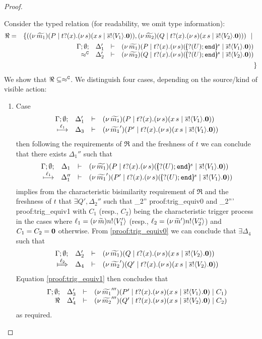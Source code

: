 \begin{proof}
\begin{enumerate}
				\noi Consider the typed relation (for readability, we omit type information):
				\begin{eqnarray*}
					\Re	&=&		\set{	(\newsp{\widetilde{m_1}}{P \Par \hotrigger{t}{x}{s}{V_1}},
										\newsp{\widetilde{m_2}}{Q \Par \hotrigger{t}{x}{s}{V_2}})
								\setbar\\
						&&			\mhorel{\Gamma}{\Delta_1'}{\newsp{\widetilde{m_1}}{P \Par \fotrigger{t}{x}{s}{\btinp{U} \tinact}{V_1}}}
									{\fwb}
									{\Delta_2'}{}{\newsp{\widetilde{m_2}}{Q \Par \fotrigger{t}{x}{s}{\btinp{U} \tinact}{V_2}}}
						\\
						&&		}
				\end{eqnarray*}
				We show that $\Re \subseteq \approx^\mathtt{C}$. We distinguish four cases, depending on the source/kind of visible action: 
				\begin{enumerate}
					\item	Case
						\[
							\begin{array}{rcll} \Gamma; \emptyset; &\Delta_1'& \vdash& (\nu\, \widetilde{m_1})(P \;|\; t ? (x) . (\nu\, s)(x\, {s} \;|\; \overline{s} ! \langle V_1 \rangle . \mathbf{0}))\\ \stackrel{\ell_1}{\longmapsto} &\Delta_3& \vdash &  (\nu\, \widetilde{m_1}')(P' \;|\; t ? (x) . (\nu\, s)(x\, {s} \;|\; \overline{s} ! \langle V_1 \rangle . \mathbf{0})) \end{array}
						\]
							then following the requirements of $\Re$ and the freshness of $t$
							we can conclude that there exists $\Delta_1''$ such that
						\[
							\mhorel{\Gamma}{\Delta_1}{\newsp{\widetilde{m_1}}{P \Par \fotrigger{t}{x}{s}{\btinp{U} \tinact}{V_1}}}
							{\hby{\ell_1}}
							{\Delta_1''}{}{\newsp{\widetilde{m_1}'}{P' \Par \fotrigger{t}{x}{s}{\btinp{U} \tinact}{V_1}}}
						\]
							implies from the characteristic bisimilarity requirement of $\Re$ and
							the freshness of $t$ that $\exists Q', \Delta_2''$ such that
							{}
							{\Delta_2''}{}
							{proof:trig_equiv0}
							and
							{\fwb}
							{\Delta_2'''}{}
							{proof:trig_equiv1}
							with $C_1$ (resp., $C_2$) being the characteristic trigger process
							in the cases where $\ell_1 = (\nu\, \widetilde{m}) n ! \langle V_1' \rangle$ (resp., $\ell_2 = (\nu\, \widetilde{m}') n ! \langle V_2' \rangle$)
							and $C_1 = C_2 = \mathbf{0}$ otherwise.
							From \eqref{proof:trig_equiv0} we can conclude that $\exists \Delta_4$ such that
						\[
							\mhorel{\Gamma}{\Delta_2'}{\newsp{\widetilde{m_1}}{Q \Par \hotrigger{t}{x}{s}{V_2}}}
							{\Hby{\ell_2}}
							{\Delta_4}{}{\newsp{\widetilde{m_2}'}{Q' \Par \hotrigger{t}{x}{s}{V_2}}}
						\]
							Equation \eqref{proof:trig_equiv1} then concludes that
						\[
							\begin{array}{rcll} \Gamma; \emptyset; &\Delta_3'& \vdash& (\nu\, \widetilde{m_1}''')(P' \;|\; t ? (x) . (\nu\, s)(x\, {s} \;|\; \overline{s} ! \langle V_1 \rangle . \mathbf{0}) \;|\; C_1)\\ \Re &\Delta_4'& \vdash &  (\nu\, \widetilde{m_2}''')(Q' \;|\; t ? (x) . (\nu\, s)(x\, {s} \;|\; \overline{s} ! \langle V_2 \rangle . \mathbf{0}) \;|\; C_2) \end{array}
						\]
							as required.


\end{enumerate}
\end{enumerate}
\end{proof}
